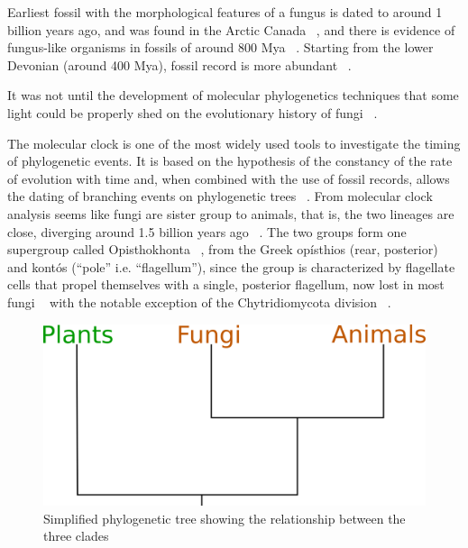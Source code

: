Earliest fossil with the morphological features of a fungus is dated to around 1 billion years ago, and was found in the Arctic Canada ~\citep{loron2019}, and there is evidence of fungus-like organisms in fossils of around 800 Mya ~\citep{bonneville2020}.
Starting from the lower Devonian (around 400 Mya), fossil record is more abundant ~\citep{lucking2009}.

It was not until the development of molecular phylogenetics techniques that some light could be properly shed on the evolutionary history of fungi ~\citep{james2006}.

The molecular clock is one of the most widely used tools to investigate the timing of phylogenetic events. It is based on the hypothesis of the constancy of the rate of evolution with time and, when combined with the use of fossil records, allows the dating of branching events on phylogenetic trees ~\citep{lepage2007, weir2008}.
From molecular clock analysis seems like fungi are sister group to animals, that is, the two lineages are close, diverging around 1.5 billion years ago ~\citep{wang1999}. The two groups form one supergroup called Opisthokhonta ~\citep{cavalier-smith1987}, from the Greek opísthios (rear, posterior) and kontós (``pole'' i.e. ``flagellum''), since the group is characterized by flagellate cells that propel themselves with a single, posterior flagellum, now lost in most fungi ~\citep{steenkamp2006} with the notable exception of the Chytridiomycota division ~\citep{james2006a}.

\begin{figure}[htbp]
\centering
\includegraphics[keepaspectratio,width=\textwidth,height=0.75\textheight]{images/pfatree.png}
\caption{Simplified phylogenetic tree showing the relationship between the three clades}
\end{figure}

